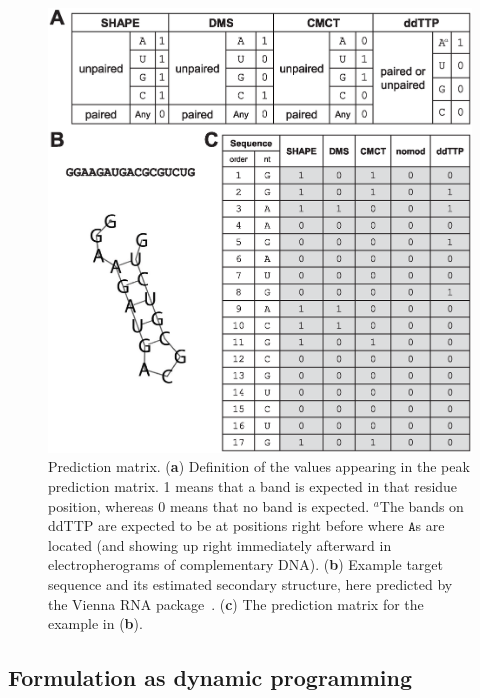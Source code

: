 \begin{figure}
\centering
\includegraphics[width=0.8\linewidth]{figures/Figure2}
\caption{Prediction matrix. (\textbf{a}) Definition of the values appearing in the peak prediction matrix. 1 means that a band is expected in that residue position, whereas 0 means that no band is expected. $^a$The bands on ddTTP are expected to be at positions right before where $\mathtt{A}$s are located (and showing up right immediately afterward in electropherograms of complementary DNA). (\textbf{b}) Example target sequence and its estimated secondary structure, here predicted by the Vienna RNA package~\citep{hofacker2003vienna}. (\textbf{c}) The prediction matrix for the example in (\textbf{b}).}
\label{f:pred-mat}
\end{figure}


\subsection{Formulation as dynamic programming}

